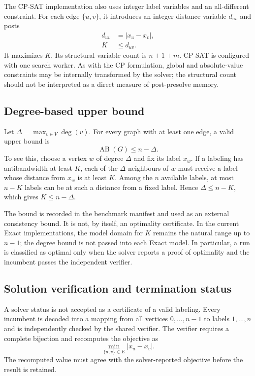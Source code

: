The CP-SAT implementation also uses integer label variables and an all-different constraint. For each edge $\{u,v\}$, it introduces an integer distance variable $d_{uv}$ and posts
\begin{align}
  d_{uv} &= |x_u-x_v|,\\
  K &\le d_{uv}.
\end{align}
It maximizes $K$. Its structural variable count is $n+1+m$. CP-SAT is configured with one search worker. As with the CP formulation, global and absolute-value constraints may be internally transformed by the solver; the structural count should not be interpreted as a direct measure of post-presolve memory.

\subsection{Degree-based upper bound}
Let $\Delta=\max_{v\in V}\deg(v)$. For every graph with at least one edge, a valid upper bound is
\begin{equation}
  \operatorname{AB}(G)\le n-\Delta.
  \label{eq:degree-upper-bound}
\end{equation}
To see this, choose a vertex $w$ of degree $\Delta$ and fix its label $x_w$. If a labeling has antibandwidth at least $K$, each of the $\Delta$ neighbours of $w$ must receive a label whose distance from $x_w$ is at least $K$. Among the $n$ available labels, at most $n-K$ labels can be at such a distance from a fixed label. Hence $\Delta\le n-K$, which gives $K\le n-\Delta$.

The bound is recorded in the benchmark manifest and used as an external consistency bound. It is not, by itself, an optimality certificate. In the current Exact implementations, the model domain for $K$ remains the natural range up to $n-1$; the degree bound is not passed into each Exact model. In particular, a run is classified as optimal only when the solver reports a proof of optimality and the incumbent passes the independent verifier.

\subsection{Solution verification and termination status}
A solver status is not accepted as a certificate of a valid labeling. Every incumbent is decoded into a mapping from all vertices $0,\ldots,n-1$ to labels $1,\ldots,n$ and is independently checked by the shared verifier. The verifier requires a complete bijection and recomputes the objective as
\[
  \min_{\{u,v\}\in E}|x_u-x_v|.
\]
The recomputed value must agree with the solver-reported objective before the result is retained.

